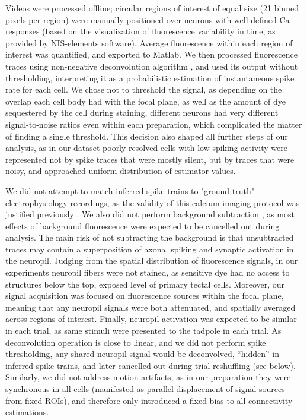 \documentclass{article}
\begin{document}
Videos were processed offline; circular regions of interest of equal size (21 binned pixels per region) were manually positioned over neurons with well defined Ca responses (based on the visualization of fluorescence variability in time, as provided by NIS-elements software). Average fluorescence within each region of interest was quantified, and exported to Matlab. We then processed fluorescence traces using non-negative deconvolution algorithm \citep{vogelstein2010oopsi}, and used its output without thresholding, interpreting it as a probabilistic estimation of instantaneous spike rate for each cell. We chose not to threshold the signal, as depending on the overlap each cell body had with the focal plane, as well as the amount of dye sequestered by the cell during staining, different neurons had very different signal-to-noise ratios even within each preparation, which complicated the matter of finding a single threshold. This decision also shaped all further steps of our analysis, as in our dataset poorly resolved cells with low spiking activity were represented not by spike traces that were mostly silent, but by traces that were noisy, and approached uniform distribution of estimator values. %

We did not attempt to match inferred spike trains to "ground-truth" electrophysiology recordings, as the validity of this calcium imaging protocol was justified previously \citep{xu2011, truszkowski2017}. We also did not perform background subtraction \citep{truszkowski2017}, as most effects of background fluorescence were expected to be cancelled out during analysis. The main risk of not subtracting the background is that unsubtracted traces may contain a superposition of axonal spiking and synaptic activation in the neuropil. Judging from the spatial distribution of fluorescence signals, in our experiments neuropil fibers were not stained, as sensitive dye had no access to structures below the top, exposed level of primary tectal cells. Moreover, our signal acquisition was focused on fluorescence sources within the focal plane, meaning that any  neuropil signals were both attenuated, and spatially averaged across regions of interest. Finally, neuropil activation was expected to be similar in each trial, as same stimuli were presented to the tadpole in each trial. As deconvolution operation is close to linear, and we did not perform spike thresholding, any shared neuropil signal would be deconvolved, “hidden” in inferred spike-trains, and later cancelled out during trial-reshuffling (see below). Similarly, we did not address motion artifacts, as in our preparation they were synchronous in all cells (manifested as parallel displacement of signal sources from fixed ROIs), and therefore only introduced a fixed bias to all connectivity estimations.
\end{document}
